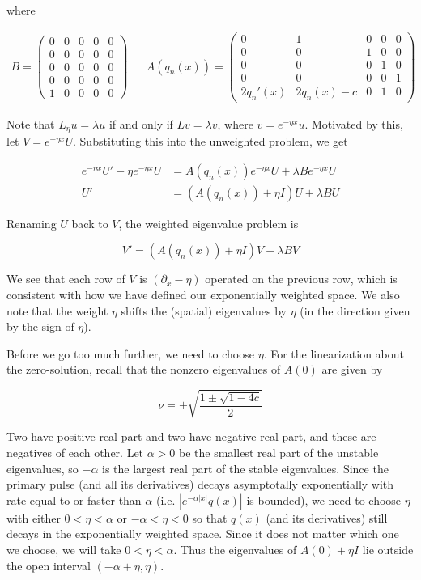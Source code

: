 \documentclass[12pt]{article}
\begin{document}
where

\begin{align*}
B = \begin{pmatrix}0 & 0 & 0 & 0 & 0 \\0 & 0 & 0 & 0 & 0 \\0  & 0 & 0 & 0 & 0 \\0 & 0 & 0 & 0 & 0 \\1 & 0 & 0 & 0 & 0 \end{pmatrix} && 
A(q_n(x)) = \begin{pmatrix}0 & 1 & 0 & 0 & 0 \\0 & 0 & 1 & 0 & 0 \\0 & 0 & 0 & 1 & 0 \\0 & 0 & 0 & 0 & 1 \\
2q_n'(x) & 2q_n(x) - c & 0 & 1 & 0 \end{pmatrix} 
\end{align*}

Note that $L_\eta u = \lambda u$ if and only if $L v = \lambda v$, where $v = e^{-\eta x} u$. Motivated by this, let $V = e^{-\eta x} U$. Substituting this into the unweighted problem, we get

\begin{align*}
e^{-\eta x} U' - \eta e^{-\eta x}U &= A(q_n(x))e^{-\eta x}U + \lambda B e^{-\eta x}U \\
U' &= (A(q_n(x)) + \eta I) U + \lambda B U
\end{align*}

Renaming $U$ back to $V$, the weighted eigenvalue problem is

\begin{equation}\label{weightedeig}
V' = (A(q_n(x)) + \eta I)V + \lambda B V
\end{equation}

We see that each row of $V$ is $(\partial_x - \eta)$ operated on the previous row, which is consistent with how we have defined our exponentially weighted space. We also note that the weight $\eta$ shifts the (spatial) eigenvalues by $\eta$ (in the direction given by the sign of $\eta$). 

Before we go too much further, we need to choose $\eta$. For the linearization about the zero-solution, recall that the nonzero eigenvalues of $A(0)$ are given by

\[
\nu = \pm \sqrt{ \frac{1 \pm \sqrt{1 - 4c} }{2}}
\]

Two have positive real part and two have negative real part, and these are negatives of each other. Let $\alpha > 0$ be the smallest real part of the unstable eigenvalues, so $-\alpha$ is the largest real part of the stable eigenvalues. Since the primary pulse (and all its derivatives) decays asymptotally exponentially with rate equal to or faster than $\alpha$ (i.e. $|e^{-\alpha |x|} q(x)|$ is bounded), we need to choose $\eta$ with either $0 < \eta < \alpha$ or $-\alpha < \eta < 0$ so that $q(x)$ (and its derivatives) still decays in the exponentially weighted space. Since it does not matter which one we choose, we will take $0 < \eta < \alpha$. Thus the eigenvalues of $A(0) + \eta I$ lie outside the open interval $(-\alpha + \eta, \eta)$.\\
\end{document}

